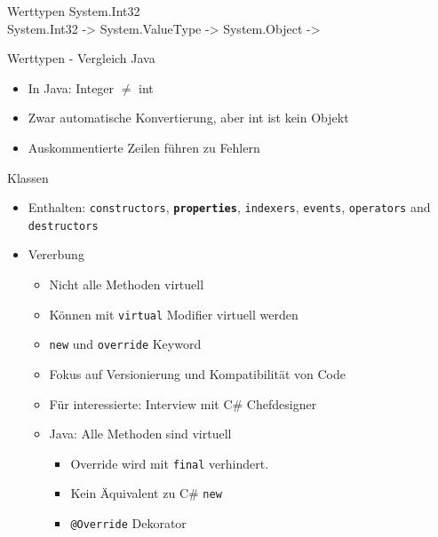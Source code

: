 \documentclass[11pt]{beamer}
\begin{document}
\begin{frame}{Werttypen}
System.Int32 \\ %
System.Int32 -> System.ValueType -> System.Object ->
\end{frame}


\begin{frame}{Werttypen - Vergleich Java}
	\begin{itemize}
		\item In Java: Integer $\neq$ int
		\item Zwar automatische Konvertierung, aber int ist kein Objekt
		\item Auskommentierte Zeilen führen zu Fehlern
	\end{itemize}
	
\end{frame}

\begin{frame}{Klassen}

	\begin{itemize}
		\item  Enthalten: \texttt{constructors}, \textbf{\texttt{properties}}, \texttt{indexers}, \texttt{events}, \texttt{operators} and \texttt{destructors}
		\item Vererbung 
		\begin{itemize}
			\item Nicht alle Methoden virtuell
			\item Können mit \texttt{virtual} Modifier virtuell werden
			\item \texttt{new} und \texttt{override} Keyword 
			\item Fokus auf Versionierung und Kompatibilität von Code
			\item Für interessierte: Interview mit C\# Chefdesigner \cite{interview_virtual}
			\item Java: Alle Methoden sind virtuell
			\begin{itemize}
				\item Override wird mit \texttt{final} verhindert.
				\item Kein Äquivalent zu C\# \texttt{new}
				\item \texttt{@Override} Dekorator
			\end{itemize}
		\end{itemize}
	\end{itemize}
\end{frame}
\end{document}
